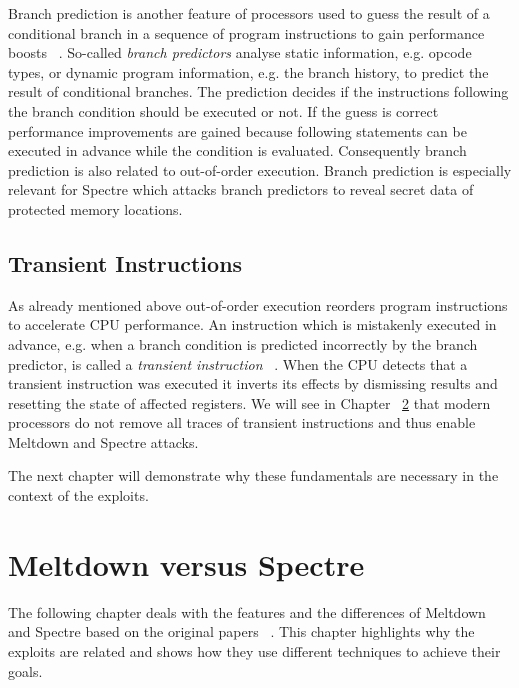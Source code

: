 \documentclass[a4paper,oneside,openright] {scrreprt}
\begin{document}
Branch prediction is another feature of processors used to guess the result of a conditional branch in a sequence 
of program instructions to gain performance boosts ~\cite{smith1995microarchitecture}.
So-called \textit{branch predictors} analyse static information, e.g. opcode types, or dynamic program information, 
e.g. the branch history, to predict the result of conditional branches.
The prediction decides if the instructions following the branch condition should be executed or not.
If the guess is correct performance improvements are gained because following statements can be executed in advance 
while the condition is evaluated. Consequently branch prediction is also related to out-of-order execution.
Branch prediction is especially relevant for Spectre which attacks branch predictors to reveal secret data of 
protected memory locations.

\section{Transient Instructions}
\label{ch:intro:branch_prediction}

As already mentioned above out-of-order execution reorders program instructions to accelerate CPU performance.
An instruction which is mistakenly executed in advance, e.g. when a branch condition is predicted incorrectly by the branch predictor, 
is called a \textit{transient instruction} ~\cite{lipp2018meltdown, kocher2018spectre}.
When the CPU detects that a transient instruction was executed it inverts its effects by dismissing results 
and resetting the state of affected registers.
We will see in Chapter ~\ref{ch:meltdownVersusSpectre} that modern processors do not remove all traces of transient instructions 
and thus enable Meltdown and Spectre attacks.

The next chapter will demonstrate why these fundamentals are necessary in the context of the exploits.

\chapter{Meltdown versus Spectre}
\label{ch:meltdownVersusSpectre}

The following chapter deals with the features and the differences of Meltdown and Spectre based on the
 original papers ~\cite{lipp2018meltdown, kocher2018spectre}. This chapter highlights why the exploits are related
 and shows how they use different techniques to achieve their goals.
 
\end{document}
